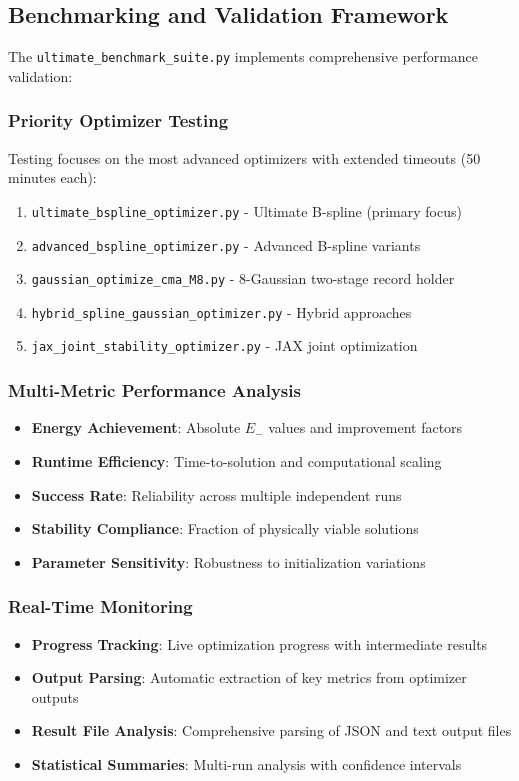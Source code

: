 \documentclass[12pt,a4paper]{article}
\begin{document}
\subsection{Benchmarking and Validation Framework}

The \texttt{ultimate\_benchmark\_suite.py} implements comprehensive performance validation:

\subsubsection{Priority Optimizer Testing}
Testing focuses on the most advanced optimizers with extended timeouts (50 minutes each):
\begin{enumerate}
\item \texttt{ultimate\_bspline\_optimizer.py} - Ultimate B-spline (primary focus)
\item \texttt{advanced\_bspline\_optimizer.py} - Advanced B-spline variants
\item \texttt{gaussian\_optimize\_cma\_M8.py} - 8-Gaussian two-stage record holder
\item \texttt{hybrid\_spline\_gaussian\_optimizer.py} - Hybrid approaches
\item \texttt{jax\_joint\_stability\_optimizer.py} - JAX joint optimization
\end{enumerate}

\subsubsection{Multi-Metric Performance Analysis}
\begin{itemize}
\item \textbf{Energy Achievement}: Absolute $E_-$ values and improvement factors
\item \textbf{Runtime Efficiency}: Time-to-solution and computational scaling
\item \textbf{Success Rate}: Reliability across multiple independent runs
\item \textbf{Stability Compliance}: Fraction of physically viable solutions
\item \textbf{Parameter Sensitivity}: Robustness to initialization variations
\end{itemize}

\subsubsection{Real-Time Monitoring}
\begin{itemize}
\item \textbf{Progress Tracking}: Live optimization progress with intermediate results
\item \textbf{Output Parsing}: Automatic extraction of key metrics from optimizer outputs
\item \textbf{Result File Analysis}: Comprehensive parsing of JSON and text output files
\item \textbf{Statistical Summaries}: Multi-run analysis with confidence intervals
\end{itemize}
\end{document}
